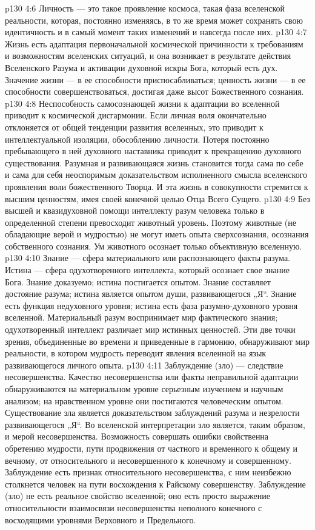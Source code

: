 \vs p130 4:6 Личность --- это такое проявление космоса, такая фаза вселенской реальности, которая, постоянно изменяясь, в то же время может сохранять свою идентичность и в самый момент таких изменений и навсегда после них.
\vs p130 4:7 Жизнь есть адаптация первоначальной космической причинности к требованиям и возможностям вселенских ситуаций, и она возникает в результате действия Вселенского Разума и активации духовной искры Бога, который есть дух. Значение жизни --- в ее способности приспосабливаться; ценность жизни --- в ее способности совершенствоваться, достигая даже высот Божественного сознания.
\vs p130 4:8 Неспособность самосознающей жизни к адаптации во вселенной приводит к космической дисгармонии. Если личная воля окончательно отклоняется от общей тенденции развития вселенных, это приводит к интеллектуальной изоляции, обособлению личности. Потеря постоянно пребывающего в ней духовного наставника приводит к прекращению духовного существования. Разумная и развивающаяся жизнь становится тогда сама по себе и сама для себя неоспоримым доказательством исполненного смысла вселенского проявления воли божественного Творца. И эта жизнь в совокупности стремится к высшим ценностям, имея своей конечной целью Отца Всего Сущего.
\vs p130 4:9 Без высшей и квазидуховной помощи интеллекту разум человека только в определенной степени превосходит животный уровень. Поэтому животные (не обладающие верой и мудростью) не могут иметь опыта сверхсознания, осознания собственного сознания. Ум животного осознает только объективную вселенную.
\vs p130 4:10 Знание --- сфера материального или распознающего факты разума. Истина --- сфера одухотворенного интеллекта, который осознает свое знание Бога. Знание доказуемо; истина постигается опытом. Знание составляет достояние разума; истина является опытом души, развивающегося „Я“. Знание есть функция недуховного уровня; истина есть фаза разумно\hyp{}духовного уровня вселенной. Материальный разум воспринимает мир фактического знания; одухотворенный интеллект различает мир истинных ценностей. Эти две точки зрения, объединенные во времени и приведенные в гармонию, обнаруживают мир реальности, в котором мудрость переводит явления вселенной на язык развивающегося личного опыта.
\vs p130 4:11 Заблуждение (зло) --- следствие несовершенства. Качество несовершенства или факты неправильной адаптации обнаруживаются на материальном уровне серьезным изучением и научным анализом; на нравственном уровне они постигаются человеческим опытом. Существование зла является доказательством заблуждений разума и незрелости развивающегося „Я“. Во вселенской интерпретации зло является, таким образом, и мерой несовершенства. Возможность совершать ошибки свойственна обретению мудрости, пути продвижения от частного и временного к общему и вечному, от относительного и несовершенного к конечному и совершенному. Заблуждение есть признак относительного несовершенства, с ним неизбежно столкнется человек на пути восхождения к Райскому совершенству. Заблуждение (зло) не есть реальное свойство вселенной; оно есть просто выражение относительности взаимосвязи несовершенства неполного конечного с восходящими уровнями Верховного и Предельного.
